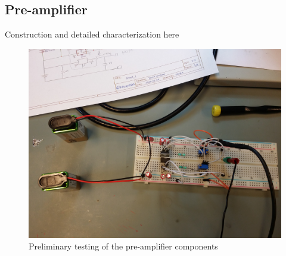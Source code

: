 \documentclass[a4paper]{article}
\begin{document}
\clearpage
\begin{appendices}

\section{Pre-amplifier}
\label{pre_amp}

Construction and detailed characterization here

\begin{figure}[ht!]
\centering
\includegraphics[width=\textwidth]{fig/IMG_20201005_104331.jpg}
\caption{Preliminary testing of the pre-amplifier components}
\end{figure}



\end{appendices}
\end{document}
